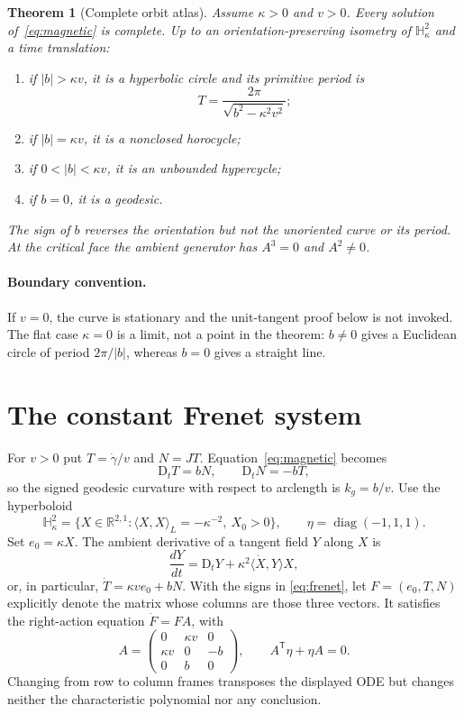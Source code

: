 \documentclass[10pt]{article}
\newtheorem{theorem}{Theorem}
\newcommand{\Hh}{\mathbb H^2_\kappa}
\newcommand{\R}{\mathbb R}
\newcommand{\D}{\mathrm D}
\begin{document}
\begin{theorem}[Complete orbit atlas]\label{thm:atlas}
Assume $\kappa>0$ and $v>0$.  Every solution of~\eqref{eq:magnetic} is complete.
Up to an orientation-preserving isometry of $\Hh$ and a time translation:
\begin{enumerate}
 \item if $|b|>\kappa v$, it is a hyperbolic circle and its primitive period is
 \begin{equation}\label{eq:period}
    T=\frac{2\pi}{\sqrt{b^2-\kappa^2v^2}};
 \end{equation}
 \item if $|b|=\kappa v$, it is a nonclosed horocycle;
 \item if $0<|b|<\kappa v$, it is an unbounded hypercycle;
 \item if $b=0$, it is a geodesic.
\end{enumerate}
The sign of $b$ reverses the orientation but not the unoriented curve or its
period.  At the critical face the ambient generator has $A^3=0$ and $A^2\ne0$.
\end{theorem}

\paragraph{Boundary convention.}
If $v=0$, the curve is stationary and the unit-tangent proof below is not
invoked.  The flat case $\kappa=0$ is a limit, not a point in the theorem:
$b\ne0$ gives a Euclidean circle of period $2\pi/|b|$, whereas $b=0$ gives a
straight line.

\section{The constant Frenet system}
For $v>0$ put $T=\dot\gamma/v$ and $N=JT$.  Equation~\eqref{eq:magnetic}
becomes
\begin{equation}\label{eq:frenet}
  \D_tT=bN,\qquad \D_tN=-bT,
\end{equation}
so the signed geodesic curvature with respect to arclength is $k_g=b/v$.
Use the hyperboloid
\[
 \Hh=\{X\in\R^{2,1}:\langle X,X\rangle_L=-\kappa^{-2},\ X_0>0\},
 \qquad \eta=\operatorname{diag}(-1,1,1).
\]
Set $e_0=\kappa X$.  The ambient derivative of a tangent field $Y$ along
$X$ is
\begin{equation}\label{eq:gauss}
 \frac{dY}{dt}=\D_tY+\kappa^2\langle\dot X,Y\rangle X,
\end{equation}
or, in particular, $\dot T=\kappa v e_0+bN$.  With the signs in
\eqref{eq:frenet}, let $F=(e_0,T,N)$ explicitly denote the matrix whose
columns are those three vectors.  It satisfies the right-action equation
$\dot F=FA$, with
\begin{equation}\label{eq:A}
 A=\begin{pmatrix}
 0&\kappa v&0\\
 \kappa v&0&-b\\
 0&b&0
 \end{pmatrix},\qquad A^{\mathsf T}\eta+\eta A=0.
\end{equation}
Changing from row to column frames transposes the displayed ODE but changes
neither the characteristic polynomial nor any conclusion.
\end{document}

